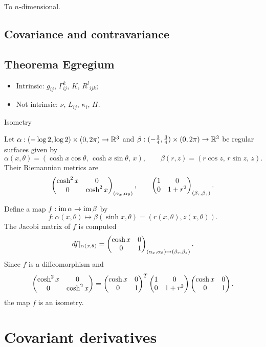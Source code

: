 \documentclass{../note}
\def\a{\alpha}
\begin{document}
To $n$-dimensional.

\section{Covariance and contravariance}


\section{Theorema Egregium}

\begin{itemize}
\item Intrinsic: $g_{ij}$, $\Gamma_{ij}^k$, $K$, ${R^l}_{ijk}$;
\item Not intrinsic: $\nu$, $L_{ij}$, $\kappa_i$, $H$.
\end{itemize}

Isometry
\begin{ex}
Let $\a:(-\log2,\log2)\times(0,2\pi)\to\R^3$ and $\beta:(-\frac34,\frac34)\times(0,2\pi)\to\mathbb{R}^3$ be regular surfaces given by
\[\a(x,\theta)=(\cosh x\cos\theta,\,\cosh x\sin\theta,\,x),\qquad
\beta(r,z)=(r\cos z,\,r\sin z,\,z).\]
Their Riemannian metrics are
\[\mat{\cosh^2x&0\\0&\cosh^2x}_{(\a_x,\a_\theta)},\qquad\mat{1&0\\0&1+r^2}_{(\beta_r,\beta_z)}.\]

Define a map $f:\im\a\to\im\beta$ by
\[f:\a(x,\theta)\mapsto\beta(\sinh x,\theta)=(r(x,\theta),z(x,\theta)).\]
The Jacobi matrix of $f$ is computed
\[df|_{\a(x,\theta)}=\mat{\cosh x&0\\0&1}_{(\a_x,\a_\theta)\to(\beta_r,\beta_z)}.\]
Since $f$ is a diffeomorphism and
\[\begin{pmatrix}\cosh^2x&0\\0&\cosh^2x\end{pmatrix}=\begin{pmatrix}\cosh x&0\\0&1\end{pmatrix}^T\begin{pmatrix}1&0\\0&1+r^2\end{pmatrix}\begin{pmatrix}\cosh x&0\\0&1\end{pmatrix},\]
the map $f$ is an isometry.
\end{ex}




\chapter{Covariant derivatives}
\end{document}
